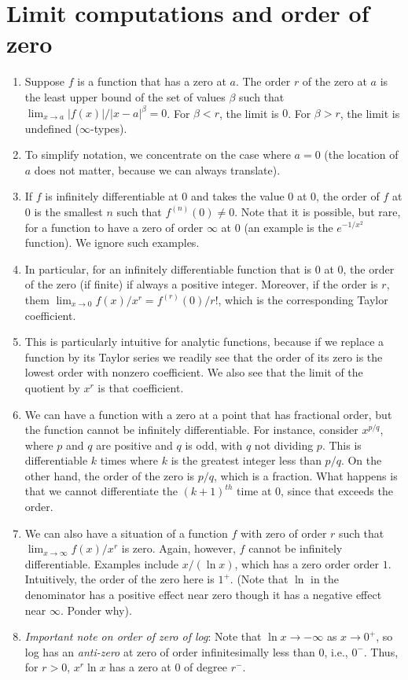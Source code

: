 \documentclass[10pt]{amsart}
\begin{document}
\section{Limit computations and order of zero}

\begin{enumerate}
\item Suppose $f$ is a function that has a zero at $a$. The order $r$
  of the zero at $a$ is the least upper bound of the set of values
  $\beta$ such that $\lim_{x \to a} |f(x)|/|x - a|^\beta = 0$. For
  $\beta < r$, the limit is $0$. For $\beta > r$, the limit is
  undefined ($\infty$-types).
\item To simplify notation, we concentrate on the case where $a = 0$
  (the location of $a$ does not matter, because we can always translate).
\item If $f$ is infinitely differentiable at $0$ and takes the value
  $0$ at $0$, the order of $f$ at $0$ is the smallest $n$ such that
  $f^{(n)}(0) \ne 0$. Note that it is possible, but rare, for a
  function to have a zero of order $\infty$ at $0$ (an example is the
  $e^{-1/x^2}$ function). We ignore such examples.
\item In particular, for an infinitely differentiable function that is
  $0$ at $0$, the order of the zero (if finite) if always a positive
  integer. Moreover, if the order is $r$, them $\lim_{x \to 0}
  f(x)/x^r = f^{(r)}(0)/r!$, which is the corresponding Taylor
  coefficient.
\item This is particularly intuitive for analytic functions, because
  if we replace a function by its Taylor series we readily see that
  the order of its zero is the lowest order with nonzero
  coefficient. We also see that the limit of the quotient by $x^r$ is
  that coefficient.
\item We can have a function with a zero at a point that has
  fractional order, but the function cannot be infinitely
  differentiable. For instance, consider $x^{p/q}$, where $p$ and $q$
  are positive and $q$ is odd, with $q$ not dividing $p$. This is
  differentiable $k$ times where $k$ is the greatest integer less than
  $p/q$. On the other hand, the order of the zero is $p/q$, which is a
  fraction. What happens is that we cannot differentiate the
  $(k+1)^{th}$ time at $0$, since that exceeds the order.
\item We can also have a situation of a function $f$ with zero of
  order $r$ such that $\lim_{x \to \infty} f(x)/x^r$ is zero. Again,
  however, $f$ cannot be infinitely differentiable. Examples include
  $x/(\ln x)$, which has a zero order order $1$. Intuitively, the
  order of the zero here is $1^+$. (Note that $\ln$ in the denominator
  has a positive effect near zero though it has a negative effect near
  $\infty$. Ponder why).
\item {\em Important note on order of zero of log}: Note that $\ln x
  \to -\infty$ as $x \to 0^+$, so log has an {\em anti-zero} at zero
  of order infinitesimally less than $0$, i.e., $0^-$. Thus, for $r >
  0$, $x^r \ln x$ has a zero at $0$ of degree $r^-$.


\end{enumerate}
\end{document}

